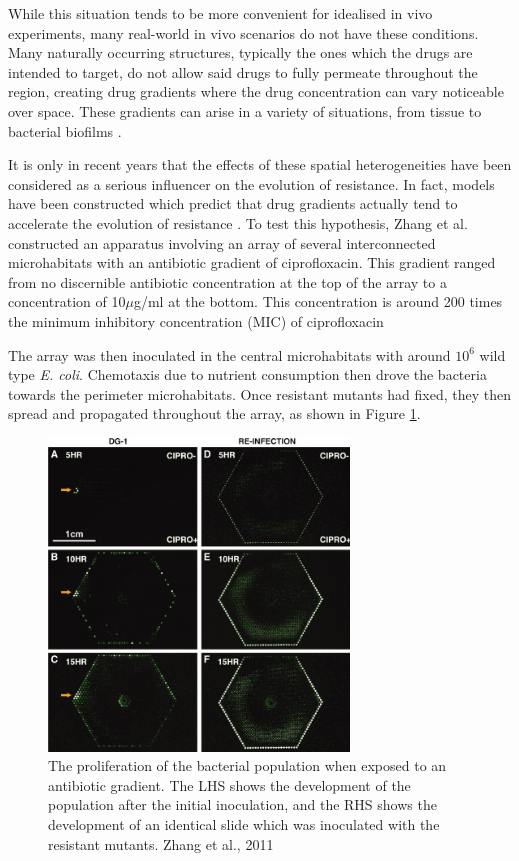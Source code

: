 \documentclass[a4paper,12pt]{article}
\begin{document}
While this situation tends to be more convenient for idealised in vivo experiments, many real-world in vivo scenarios do not have these conditions.
Many naturally occurring structures, typically the ones which the drugs are intended to target, do not allow said drugs to fully permeate throughout
the region, creating drug gradients where the drug concentration can vary noticeable over space.  These gradients can arise in a variety of 
situations, from tissue \cite{bioref:minelli-peflox-penet} to bacterial biofilms \cite{bioref:Kim-biofilm-antibio-grad-2010}.

It is only in recent years that the effects of these spatial heterogeneities have been considered as a serious influencer on the evolution of resistance. 
In fact, models have been constructed which predict that drug gradients actually tend to accelerate the evolution of resistance \cite{bioref:Hermsen-source-and-sink}.
To test this hypothesis, Zhang et al. \cite{bioref:Zhang-effects-of-antibio-grad} constructed an apparatus involving an array of several interconnected microhabitats with 
an antibiotic gradient of ciprofloxacin.  This gradient ranged from no discernible antibiotic concentration at the top of the array to a concentration of 
10$\mu$g/ml at the bottom.  This concentration is around 200 times the minimum inhibitory concentration (MIC) of ciprofloxacin \cite{bioref:ciprofloxa-mic}

The array was then inoculated in the central microhabitats with around $10^6$ wild type \textit{E. coli}.  Chemotaxis due to nutrient consumption 
then drove the bacteria towards the perimeter microhabitats.  Once resistant mutants had fixed, they then spread and propagated throughout the array,
as shown in Figure \ref{fig:Zhang-gradient-apparatus}.

\begin{figure}[H]
 \centering
 \includegraphics[width=8cm]{Zhang-microhab-gradient-cropped}
 \caption{The proliferation of the bacterial population when exposed to an antibiotic gradient.  The LHS shows the development
 of the population after the initial inoculation, and the RHS shows the development of an identical slide which was 
 inoculated with the resistant mutants. Zhang et al., 2011}
 \label{fig:Zhang-gradient-apparatus}
\end{figure}
\end{document}
